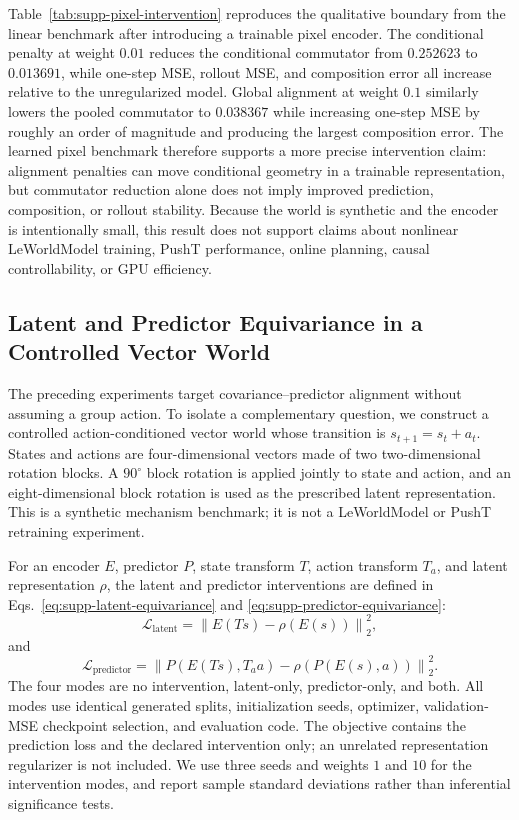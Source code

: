 \documentclass{article}
\begin{document}
Table~\ref{tab:supp-pixel-intervention} reproduces the qualitative boundary
from the linear benchmark after introducing a trainable pixel encoder. The
conditional penalty at weight $0.01$ reduces the conditional commutator from
$0.252623$ to $0.013691$, while one-step MSE, rollout MSE, and composition
error all increase relative to the unregularized model. Global alignment at
weight $0.1$ similarly lowers the pooled commutator to $0.038367$ while
increasing one-step MSE by roughly an order of magnitude and producing the
largest composition error. The learned pixel benchmark therefore supports a
more precise intervention claim: alignment penalties can move conditional
geometry in a trainable representation, but commutator reduction alone does
not imply improved prediction, composition, or rollout stability. Because the
world is synthetic and the encoder is intentionally small, this result does
not support claims about nonlinear LeWorldModel training, PushT performance,
online planning, causal controllability, or GPU efficiency.

\subsection{Latent and Predictor Equivariance in a Controlled Vector World}
\label{sec:supp-equivariance-intervention}

The preceding experiments target covariance--predictor alignment without
assuming a group action. To isolate a complementary question, we construct a
controlled action-conditioned vector world whose transition is
$s_{t+1}=s_t+a_t$. States and actions are four-dimensional vectors made of two
two-dimensional rotation blocks. A $90^\circ$ block rotation is applied jointly
to state and action, and an eight-dimensional block rotation is used as the
prescribed latent representation. This is a synthetic mechanism benchmark;
it is not a LeWorldModel or PushT retraining experiment.

For an encoder $E$, predictor $P$, state transform $T$, action transform
$T_a$, and latent representation $\rho$, the latent and predictor
interventions are defined in Eqs.~\eqref{eq:supp-latent-equivariance} and
\eqref{eq:supp-predictor-equivariance}:
\begin{equation}
\mathcal{L}_{\mathrm{latent}}=
\left\|E(Ts)-\rho(E(s))\right\|_2^2,
\label{eq:supp-latent-equivariance}
\end{equation}
and
\begin{equation}
\mathcal{L}_{\mathrm{predictor}}=
\left\|P(E(Ts),T_a a)-\rho\!\left(P(E(s),a)\right)\right\|_2^2.
\label{eq:supp-predictor-equivariance}
\end{equation}
The four modes are no intervention, latent-only, predictor-only, and both.
All modes use identical generated splits, initialization seeds, optimizer,
validation-MSE checkpoint selection, and evaluation code. The objective
contains the prediction loss and the declared intervention only; an unrelated
representation regularizer is not included. We use three seeds and weights
$1$ and $10$ for the intervention modes, and report sample standard
deviations rather than inferential significance tests.
\end{document}
